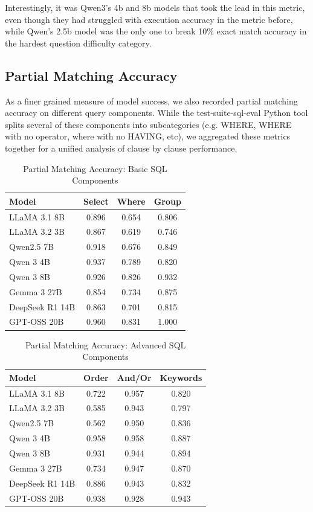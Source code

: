 \documentclass[sigconf]{acmart}
\begin{document}
Interestingly, it was Qwen3's 4b and 8b models that took the lead in this metric, even though they had struggled with
execution accuracy in the metric before, while Qwen's 2.5b model was the only one to break 10\% exact match accuracy
in the hardest question difficulty category.

\subsection*{Partial Matching Accuracy}

As a finer grained measure of model success, we also recorded partial matching accuracy on different query components.
While the test-suite-sql-eval Python tool splits several of these components into subcategories (e.g. WHERE, WHERE with
no operator, where with no HAVING, etc), we aggregated these metrics together for a unified analysis of clause by clause
performance.

\begin{table}[H]
\centering
\caption{Partial Matching Accuracy: Basic SQL Components}
\label{tab:partial_matching_basic}
\begin{tabular}{lccc}
\hline
\textbf{Model} & \textbf{Select} & \textbf{Where} & \textbf{Group} \\
\hline
LLaMA 3.1 8B & 0.896 & 0.654 & 0.806 \\
LLaMA 3.2 3B & 0.867 & 0.619 & 0.746 \\
Qwen2.5 7B & 0.918 & 0.676 & 0.849 \\
Qwen 3 4B & 0.937 & 0.789 & 0.820 \\
Qwen 3 8B & 0.926 & 0.826 & 0.932 \\
Gemma 3 27B & 0.854 & 0.734 & 0.875 \\
DeepSeek R1 14B & 0.863 & 0.701 & 0.815 \\
GPT-OSS 20B & 0.960 & 0.831 & 1.000 \\
\hline
\end{tabular}
\end{table}

\begin{table}[H]
\centering
\caption{Partial Matching Accuracy: Advanced SQL Components}
\label{tab:partial_matching_advanced}
\begin{tabular}{lccc}
\hline
\textbf{Model} & \textbf{Order} & \textbf{And/Or} & \textbf{Keywords} \\
\hline
LLaMA 3.1 8B & 0.722 & 0.957 & 0.820 \\
LLaMA 3.2 3B & 0.585 & 0.943 & 0.797 \\
Qwen2.5 7B & 0.562 & 0.950 & 0.836 \\
Qwen 3 4B & 0.958 & 0.958 & 0.887 \\
Qwen 3 8B & 0.931 & 0.944 & 0.894 \\
Gemma 3 27B & 0.734 & 0.947 & 0.870 \\
DeepSeek R1 14B & 0.886 & 0.943 & 0.832 \\
GPT-OSS 20B & 0.938 & 0.928 & 0.943 \\
\hline
\end{tabular}
\end{table}
\end{document}
